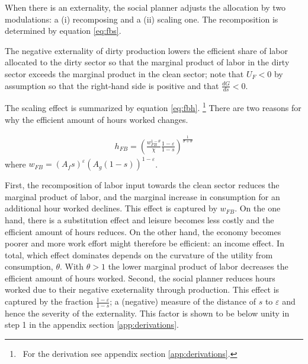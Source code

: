 When there is an externality, the social planner adjusts the allocation by two modulations: a (i) recomposing and a (ii) scaling one. 
The recomposition is determined by equation \ref{eq:fbs}.

The negative externality of dirty production  lowers the efficient share of labor allocated to  the dirty sector so that the marginal product of labor in the dirty sector exceeds the marginal product in the clean sector; note that $U_F<0$ by assumption so that the right-hand side is positive and that $\frac{dG}{ds}<0$.
\begin{comment}
The equation 
\begin{align}
\frac{-U_F}{U_C \frac{dY}{dF}}=1+\frac{\frac{dY}{dG}\frac{dG}{ds}}{\frac{dY}{dF}\frac{dF}{ds}}.
\end{align}
The term on the left-hand side is the social cost of the externality: it measures what the representative household is willing to pay for a further reduction in dirty production. 
\end{comment}

The scaling effect is summarized by equation \ref{eq:fbh}.
\footnote{\ For the derivation see appendix section \ref{app:derivations}.} There are two reasons for why the efficient amount of hours worked changes. 

\begin{align}
h_{FB}= \left(\frac{w_{FB}^{1-\theta}}{\chi}\frac{1-\varepsilon}{1-s}\right)^\frac{1}{\sigma+\theta}\label{eq:heff}
\end{align}
where $w_{FB}=(A_f s)^{\varepsilon}(A_g(1-s))^{1-\varepsilon}$.


First, the recomposition of labor input towards the  clean sector reduces the marginal product of labor, and the marginal increase in consumption for an additional hour worked declines.  This effect is captured by $w_{FB}$. On the one hand, there is a substitution effect and leisure becomes less costly and the efficient amount of hours reduces. On the other hand, the economy becomes poorer and more work effort might therefore be efficient: an income effect. In total, which effect dominates depends on the curvature of the utility from consumption, $\theta$. With $\theta>1$ the  lower marginal product of labor decreases the efficient amount of hours worked. 
Second, the social planner reduces hours worked due to their negative exeternality through production. This effect is captured by the fraction $\frac{1-\varepsilon}{1-s}$; a (negative) measure of the distance of $s$ to $\varepsilon$ and hence the severity of the externality. This factor is shown to be below unity in step 1 in the appendix section \ref{app:derivations}.

